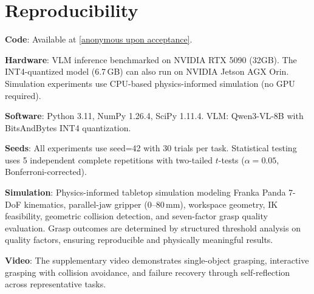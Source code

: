 \documentclass[letterpaper, 10pt]{article}
\begin{document}
\section{Reproducibility}

\textbf{Code}: Available at \url{[anonymous upon acceptance]}.

\textbf{Hardware}: VLM inference benchmarked on NVIDIA RTX 5090 (32GB). The INT4-quantized model (6.7\,GB) can also run on NVIDIA Jetson AGX Orin.
Simulation experiments use CPU-based physics-informed simulation (no GPU required).

\textbf{Software}: Python 3.11, NumPy 1.26.4, SciPy 1.11.4.
VLM: Qwen3-VL-8B with BitsAndBytes INT4 quantization.

\textbf{Seeds}: All experiments use seed=42 with 30 trials per task.
Statistical testing uses 5 independent complete repetitions with two-tailed $t$-tests ($\alpha = 0.05$, Bonferroni-corrected).

\textbf{Simulation}: Physics-informed tabletop simulation modeling Franka Panda 7-DoF kinematics, parallel-jaw gripper (0--80\,mm), workspace geometry, IK feasibility, geometric collision detection, and seven-factor grasp quality evaluation.
Grasp outcomes are determined by structured threshold analysis on quality factors, ensuring reproducible and physically meaningful results.

\textbf{Video}: The supplementary video demonstrates single-object grasping, interactive grasping with collision avoidance, and failure recovery through self-reflection across representative tasks.
\end{document}
